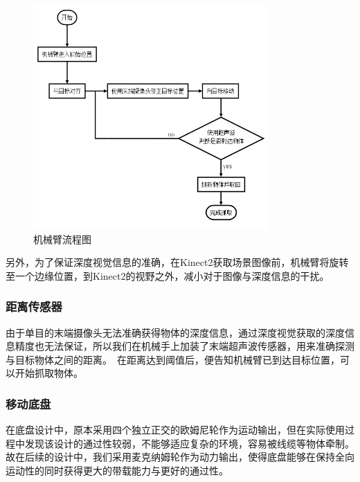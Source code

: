 \begin{figure}[H]
    \centering
    \includegraphics[width = 0.8\textwidth]{images/arm.png}
    \caption{机械臂流程图}
    \label{fig:arm}
\end{figure}

另外，为了保证深度视觉信息的准确，在Kinect2获取场景图像前，机械臂将旋转至一个边缘位置，到Kinect2的视野之外，减小对于图像与深度信息的干扰。\ 

\subsubsection{距离传感器}

由于单目的末端摄像头无法准确获得物体的深度信息，通过深度视觉获取的深度信息精度也无法保证，所以我们在机械手上加装了末端超声波传感器，用来准确探测与目标物体之间的距离。\ 在距离达到阈值后，便告知机械臂已到达目标位置，可以开始抓取物体。\ 

\subsubsection{移动底盘}

在底盘设计中，原本采用四个独立正交的欧姆尼轮作为运动输出，但在实际使用过程中发现该设计的通过性较弱，不能够适应复杂的环境，容易被线缆等物体牵制。故在后续的设计中，我们采用麦克纳姆轮作为动力输出，使得底盘能够在保持全向运动性的同时获得更大的带载能力与更好的通过性。

